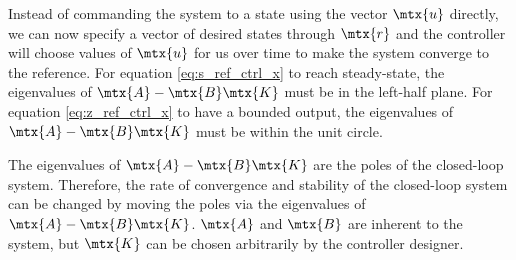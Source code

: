 Instead of commanding the \gls{system} to a \gls{state} using the vector
$\mtx{u}$ directly, we can now specify a vector of desired \glspl{state} through
$\mtx{r}$ and the \gls{controller} will choose values of $\mtx{u}$ for us over
time to make the \gls{system} converge to the \gls{reference}. For equation
\eqref{eq:s_ref_ctrl_x} to reach steady-state, the eigenvalues of
$\mtx{A} - \mtx{B}\mtx{K}$ must be in the left-half plane. For equation
\eqref{eq:z_ref_ctrl_x} to have a bounded output, the eigenvalues of
$\mtx{A} - \mtx{B}\mtx{K}$ must be within the unit circle.

The eigenvalues of $\mtx{A} - \mtx{B}\mtx{K}$ are the poles of the closed-loop
\gls{system}. Therefore, the rate of convergence and stability of the
closed-loop \gls{system} can be changed by moving the poles via the eigenvalues
of $\mtx{A} - \mtx{B}\mtx{K}$. $\mtx{A}$ and $\mtx{B}$ are inherent to the
\gls{system}, but $\mtx{K}$ can be chosen arbitrarily by the controller
designer.
